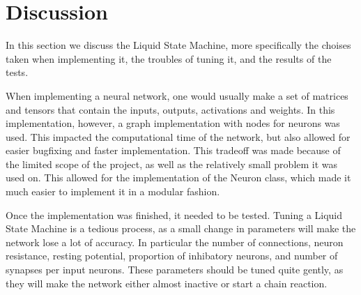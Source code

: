 \section{Discussion}

In this section we discuss the Liquid State Machine, more specifically the choises taken when implementing it, the troubles of tuning it, and the results of the tests.

When implementing a neural network, one would usually make a set of matrices and tensors that contain the inputs, outputs, activations and weights. In this implementation, however, a graph implementation with nodes for neurons was used. This impacted the computational time of the network, but also allowed for easier bugfixing and faster implementation. This tradeoff was made because of the limited scope of the project, as well as the relatively small problem it was used on. This allowed for the implementation of the Neuron class, which made it much easier to implement it in a modular fashion.

Once the implementation was finished, it needed to be tested. Tuning a Liquid State Machine is a tedious process, as a small change in parameters will make the network lose a lot of accuracy. In particular the number of connections, neuron resistance, resting potential, proportion of inhibatory neurons, and number of synapses per input neurons. These parameters should be tuned quite gently, as they will make the network either almost inactive or start a chain reaction.